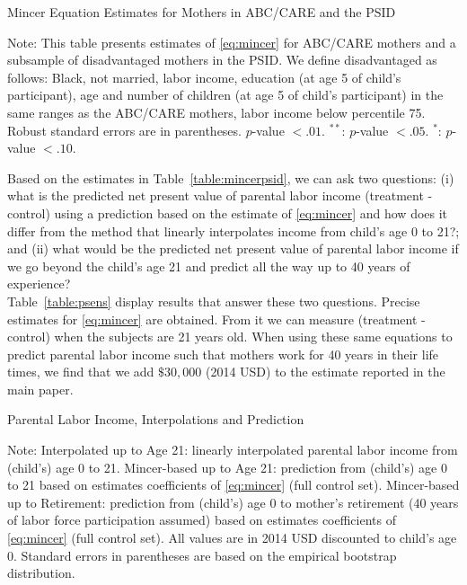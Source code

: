 \begin{table}[H]
\begin{threeparttable}
\caption{Mincer Equation Estimates for Mothers in ABC/CARE and the PSID}
\label{table:mincerpsid}
\centering
\footnotesize

\begin{tablenotes}
\footnotesize
\item Note: This table presents estimates of \eqref{eq:mincer} for ABC/CARE mothers and a subsample of disadvantaged mothers in the PSID. We define disadvantaged as follows: Black, not married, labor income, education (at age 5 of child's participant), age and number of children (at age 5 of child's participant) in the same ranges as the ABC/CARE mothers, labor income below percentile 75. Robust standard errors are in parentheses. $p$-value $< .01$. $^{**}$: $p$-value $< .05$. $^{*}$: $p$-value $< .10$.
\end{tablenotes}
\end{threeparttable}
\end{table}

\noindent Based on the estimates in Table~\ref{table:mincerpsid}, we can ask two questions: (i) what is the predicted net present value of parental labor income (treatment - control) using a prediction based on the estimate of \eqref{eq:mincer} and how does it differ from the method that linearly interpolates income from child's age 0 to 21?; and (ii) what would be the predicted net present value of parental labor income if we go beyond the child's age 21 and predict all the way up to 40 years of experience?\\

\noindent Table~\ref{table:psens} display results that answer these two questions. Precise estimates for \eqref{eq:mincer} are obtained. From it we can measure (treatment - control) when the subjects are 21 years old. When using these same equations to predict parental labor income such that mothers work for 40 years in their life times, we find that we add $\$30,000$ (2014 USD) to the estimate reported in the main paper.

\begin{table}[H]
\begin{threeparttable}
\caption{Parental Labor Income, Interpolations and Prediction}
\label{table:psens}
\centering

\begin{tablenotes}
\footnotesize
\item Note:  Interpolated up to Age 21: linearly interpolated parental labor income from (child's) age 0 to 21. Mincer-based up to Age 21: prediction from (child's) age 0 to 21 based on estimates coefficients of \eqref{eq:mincer} (full control set). Mincer-based up to Retirement: prediction from (child's) age 0 to mother's retirement (40 years of labor force participation assumed) based on estimates coefficients of \eqref{eq:mincer} (full control set). All values are in 2014 USD discounted to child's age 0. Standard errors in parentheses are based on the empirical bootstrap distribution.
\end{tablenotes}
\end{threeparttable}
\end{table}

